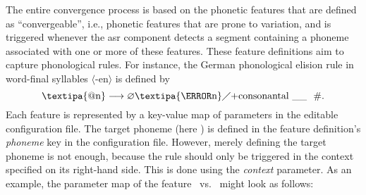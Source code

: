 The entire convergence process is based on the phonetic features that are defined as \enquote{convergeable}, i.e., phonetic features that are prone to variation, and is triggered whenever the \ac{asr} component detects a segment containing a phoneme associated with one or more of these features.
These feature definitions aim to capture phonological rules.
For instance, the German phonological  elision rule in word-final syllables $\langle$-en$\rangle$ is defined by \citep[adapted from][pp.\,142--143]{Benware1986phonetics}
%
\begin{equation}
	\text{\textipa{@n}}\longrightarrow \varnothing \text{\textipa{\s{n}}} \diagup
	\text{+consonantal} \ \_\_ \ \ \text{\#} .
	\label{eq:elision_rule}
\end{equation}
%
Each feature is represented by a key-value map of parameters in the editable configuration file.
The target phoneme (here ) is defined in the feature definition's \emph{phoneme} key in the configuration file.
However, merely defining the target phoneme is not enough, because the rule should only be triggered in the context specified on its right-hand side.
This is done using the \emph{context} parameter.
As an example, the parameter map of the feature \textipa{[E:]}~vs.~\textipa{[e:]} might look as follows:

